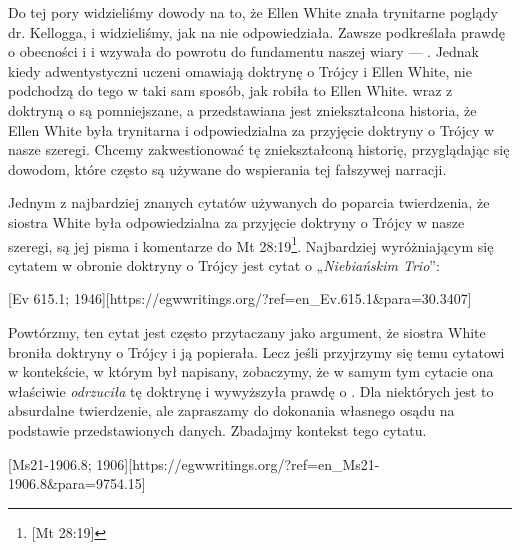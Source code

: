 
Do tej pory widzieliśmy dowody na to, że Ellen White znała trynitarne poglądy dr. Kellogga, i widzieliśmy, jak na nie odpowiedziała. Zawsze podkreślała prawdę o obecności i  i wzywała do powrotu do fundamentu naszej wiary — . Jednak kiedy adwentystyczni uczeni omawiają doktrynę o Trójcy i Ellen White, nie podchodzą do tego w taki sam sposób, jak robiła to Ellen White.  wraz z doktryną o  są pomniejszane, a przedstawiana jest zniekształcona historia, że Ellen White była trynitarna i odpowiedzialna za przyjęcie doktryny o Trójcy w nasze szeregi. Chcemy zakwestionować tę zniekształconą historię, przyglądając się dowodom, które często są używane do wspierania tej fałszywej narracji.

Jednym z najbardziej znanych cytatów używanych do poparcia twierdzenia, że siostra White była odpowiedzialna za przyjęcie doktryny o Trójcy w nasze szeregi, są jej pisma i komentarze do Mt 28:19\footnote{[Mt 28:19]}. Najbardziej wyróżniającym się cytatem w obronie doktryny o Trójcy jest cytat o „\textit{Niebiańskim Trio}”:

[Ev 615.1; 1946][https://egwwritings.org/?ref=en\_Ev.615.1&para=30.3407]

Powtórzmy, ten cytat jest często przytaczany jako argument, że siostra White broniła doktryny o Trójcy i ją popierała. Lecz jeśli przyjrzymy się temu cytatowi w kontekście, w którym był napisany, zobaczymy, że w samym tym cytacie ona właściwie \textit{odrzuciła} tę doktrynę i wywyższyła prawdę o . Dla niektórych jest to absurdalne twierdzenie, ale zapraszamy do dokonania własnego osądu na podstawie przedstawionych danych. Zbadajmy kontekst tego cytatu.

[Ms21-1906.8; 1906][https://egwwritings.org/?ref=en\_Ms21-1906.8&para=9754.15]

